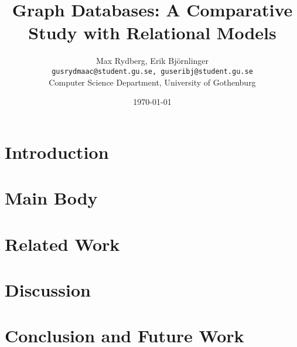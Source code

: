 \documentclass[12pt, a4paper]{article}
\title{Graph Databases: A Comparative Study with Relational Models}
\author{
  Max Rydberg, Erik Björnlinger \\
  \texttt{gusrydmaac@student.gu.se, guseribj@student.gu.se} \\
  Computer Science Department, University of Gothenburg 
}
\date{\today}
\begin{document}
\maketitle

\begin{abstract}

\end{abstract}

\section{Introduction}


\section{Main Body}


\section{Related Work}


\section{Discussion}


\section{Conclusion and Future Work}

\end{document}
